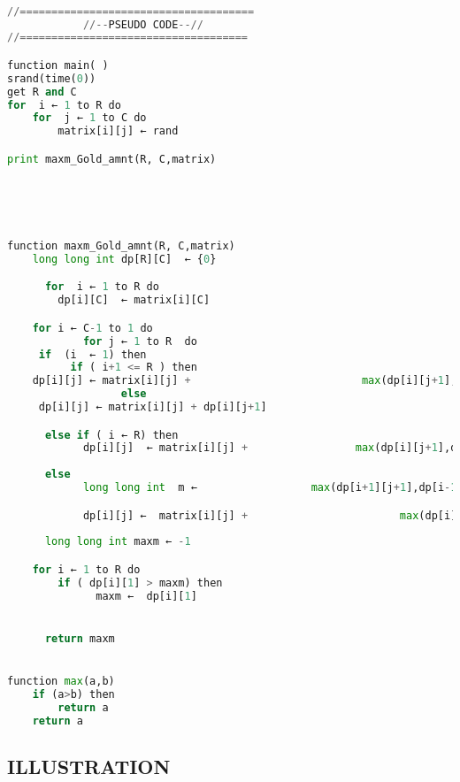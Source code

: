 \documentclass[conference]{IEEEtran}
\begin{document}
\begin{lstlisting}[caption=Algorithm 2, style=chstyle, language=python]

//=====================================
            //--PSEUDO CODE--//
//====================================

function main( )
srand(time(0))
get R and C
for  i ← 1 to R do
	for  j ← 1 to C do
		matrix[i][j] ← rand

print maxm_Gold_amnt(R, C,matrix)





function maxm_Gold_amnt(R, C,matrix)
	long long int dp[R][C]  ← {0}

      for  i ← 1 to R do
		dp[i][C]  ← matrix[i][C]

	for i ← C-1 to 1 do
            for j ← 1 to R  do 
     if  (i  ← 1) then
          if ( i+1 <= R ) then
	dp[i][j] ← matrix[i][j] +   			            max(dp[i][j+1],dp[i+1][j+1])
		          else
 	 dp[i][j] ← matrix[i][j] + dp[i][j+1]

      else if ( i ← R) then
            dp[i][j]  ← matrix[i][j] + 			       max(dp[i][j+1],dp[i-1][j+1])
        
      else
            long long int  m ← 			        max(dp[i+1][j+1],dp[i-1][j+1])

            dp[i][j] ←  matrix[i][j] + 				          max(dp[i][j+1],m);
     
      long long int maxm ← -1

	for i ← 1 to R do
		if ( dp[i][1] > maxm) then
		      maxm ←  dp[i][1]


      return maxm


function max(a,b)
	if (a>b) then
		return a
	return a


\end{lstlisting}


\subsection{ILLUSTRATION}
\end{document}
